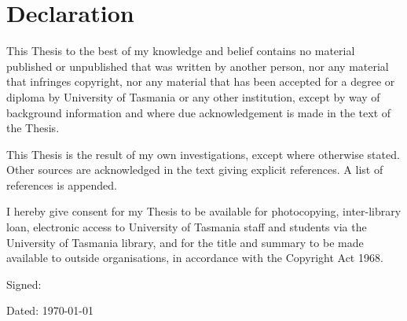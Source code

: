\chapter{Declaration}

This Thesis to the best of my knowledge and belief contains no material published or unpublished that was written by another person, nor any material that infringes copyright, nor any material that has been accepted for a degree or diploma by University of Tasmania or any other institution, except by way of background information and where due acknowledgement is made in the text of the Thesis.

This Thesis is the result of my own investigations, except where otherwise stated. Other sources are acknowledged in the text giving explicit references. A list of references is appended.


I hereby give consent for my Thesis to be available for photocopying, inter-library loan, electronic access to University of Tasmania staff and students via the University of Tasmania library, and for the title and summary to be made available to outside organisations, in accordance with the Copyright Act 1968.


   \bigskip
   \bigskip

Signed:

   \bigskip
   \bigskip

Dated: \today      %